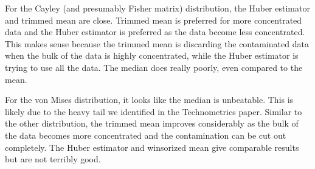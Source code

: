 \documentclass{article}\usepackage[]{graphicx}\usepackage[]{color}
\begin{document}
For the Cayley (and presumably Fisher matrix) distribution, the Huber estimator and trimmed mean are close.  Trimmed mean is preferred for more concentrated data and the Huber estimator is preferred as the data become less concentrated.  This makes sense because the trimmed mean is discarding the contaminated data when the bulk of the data is highly concentrated, while the Huber estimator is trying to use all the data.  The median does really poorly, even compared to the mean.

For the von Mises distribution, it looks like the median is unbeatable.  This is likely due to the heavy tail we identified in the Technometrics paper.  Similar to the other distribution, the trimmed mean improves considerably as the bulk of the data becomes more concentrated and the contamination can be cut out completely.  The Huber estimator and winsorized mean give comparable results but are not terribly good.
\clearpage
%

\end{document}
